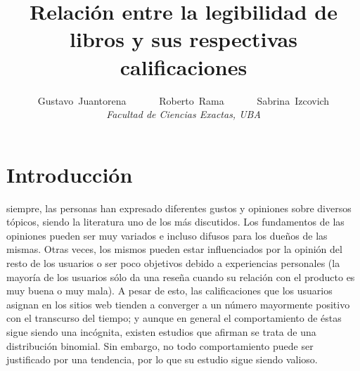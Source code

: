 \documentclass[12pt,journal,compsoc]{IEEEtran}
\begin{document}
\title{Relación entre la legibilidad de libros y sus respectivas calificaciones}

\author{Gustavo~Juantorena~~~~~~
        Roberto~Rama~~~~~~
        Sabrina~Izcovich\\
        \textit{Facultad de Ciencias Exactas, UBA}}



\maketitle
\IEEEdisplaynontitleabstractindextext
\IEEEpeerreviewmaketitle

\section{Introducción}
 siempre, las personas han expresado diferentes gustos y opiniones sobre diversos tópicos, siendo la literatura uno de los más discutidos. Los fundamentos de las opiniones pueden ser muy variados e incluso difusos para los dueños de las mismas. Otras veces, los mismos pueden estar influenciados por la opinión del resto de los usuarios\cite{muchnik} o ser poco objetivos debido a experiencias personales (la mayoría de los usuarios sólo da una reseña cuando su relación con el producto es muy buena o muy mala\cite{hu}). A pesar de esto, las calificaciones que los usuarios asignan en los sitios web tienden a converger a un número mayormente positivo con el transcurso del tiempo\cite{zhang}; y aunque en general el comportamiento de éstas sigue siendo una incógnita, existen estudios que afirman se trata de una distribución binomial\cite{hu}. Sin embargo, no todo comportamiento puede ser justificado por una tendencia\cite{zhang}, por lo que su estudio sigue siendo valioso. 
\end{document}
